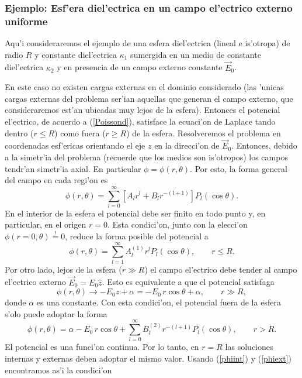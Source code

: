 \subsubsection{Ejemplo: Esf'era diel'ectrica en un campo el'ectrico externo uniforme}
Aqu'i consideraremos el ejemplo de una esfera diel'ectrica (lineal e is'otropa) de radio $R$ y constante diel'ectrica $\kappa_1$ sumergida en un medio de constante diel'ectrica $\kappa_2$ y en presencia de un campo externo constante $\vec{E}_0$.

En este caso no existen cargas externas en el dominio considerado (las 'unicas cargas externas del problema ser'ian aquellas que generan el campo externo, que consideraremos est'an ubicadas muy lejos de la esfera). Entonces el potencial el'ectrico, de acuerdo a (\ref{Poissond}), satisface la ecuaci'on de Laplace tando dentro ($r\le R$) como fuera ($r\ge R$) de la esfera. Resolveremos el problema en coordenadas esf'ericas orientando el eje $z$ en la direcci'on de $\vec{E}_0$. Entonces, debido a la simetr'ia del problema (recuerde que los medios son is'otropos) los campos tendr'an simetr'ia axial. En particular $\phi=\phi(r,\theta)$. Por esto, la forma general del campo en cada regi'on es
 \begin{equation}
 \phi(r,\theta)=\sum_{l=0}^{\infty}\left[  A_lr^{l}+B_lr^{-(l+1)}\right]
 P_l(\cos\theta).
 \end{equation}
En el interior de la esfera el potencial debe ser finito en todo punto y, en particular, en el origen $r=0$. Esta condici'on, junto con la elecci'on $\phi (r=0,\theta)\stackrel{!}{=}0$, reduce la forma posible del potencial a 
 \begin{equation}\label{phiint}
 \phi(r,\theta)=\sum_{l=1}^{\infty}A_l^{(1)}r^{l}P_l(\cos\theta), \qquad r\le R.
 \end{equation}
Por otro lado, lejos de la esfera ($r\gg R$) el campo el'ectrico debe tender al campo el'ectrico externo $\vec{E}_0=E_0\hat{z}$. Esto es equivalente a que el potencial satisfaga
\begin{equation}
 \phi(r,\theta)\to -E_0z+\alpha = -E_0\,r\cos\theta+\alpha, \qquad r\gg R,
\end{equation}
donde $\alpha$ es una constante. Con esta condici'on, el potencial fuera de la esfera s'olo puede adoptar la forma
\begin{equation}\label{phiext}
\phi(r,\theta)=\alpha-E_0\,r\cos\theta+\sum_{l=0}^{\infty}B_l^{(2)}%
 r^{-(l+1)}P_l(\cos\theta), \qquad r>R.
\end{equation}
El potencial es una funci'on continua. Por lo tanto, en $r=R$ las soluciones internas y externas deben adoptar el mismo valor. Usando (\ref{phiint}) y (\ref{phiext}) encontramos as'i la condici'on
